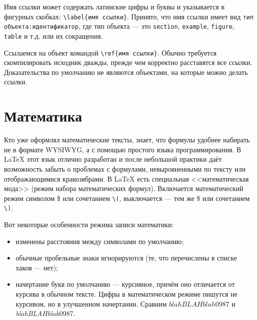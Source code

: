\documentclass[14pt, russian]{scrartcl}
\begin{document}
Имя ссылки может содержать латинские цифры и буквы и указывается в фигурных скобках: \texttt{\textbackslash{label\{имя ссылки\}}}. Принято, что имя ссылки имеет вид \texttt{тип объекта:идентификатор}, где тип объекта --- это \texttt{section}, \texttt{example}, \texttt{figure}, \texttt{table} и т.д. или их сокращения. 

Ссылаемся на объект командой \texttt{\textbackslash ref\{имя ссылки\}}. Обычно требуется скомпилировать исходник дважды, прежде чем корректно расставятся все ссылки. Доказательства по умолчанию не являются объектами, на которые можно делать ссылки.

\section{Математика}\label{Sect::mathmode}

Кто уже оформлял математические тексты, знает, что формулы удобнее набирать не в формате WYSIWYG, а с помощью простого языка программирования. В \LaTeX{} этот язык отлично разработан и после небольшой практики даёт возможность забыть о проблемах с формулами, невыровненными по тексту или отображающимися кракозябрами. В \LaTeX{} есть специальная <<математическая мода>> (режим набора математических формул). Включается математический режим символом \$ или сочетанием \texttt{\textbackslash(}, выключается --- тем же \$ или сочетанием \texttt{\textbackslash)}. 

Вот некоторые особенности режима записи математики:
\begin{itemize}
\item изменены расстояния между символами по умолчанию;
\item обычные пробельные знаки игнорируются (те, что перечислены в списке хаков --- нет);
\item начертание букв по умолчанию --- курсивное, причём оно отличается от курсива в обычном тексте. Цифры в математическом режиме пишутся не курсивом, но в улучшенном начертании. Сравним $blahBLAHblah0987$ и \textit{blahBLAHblah}0987.
\end{itemize}
\end{document}
